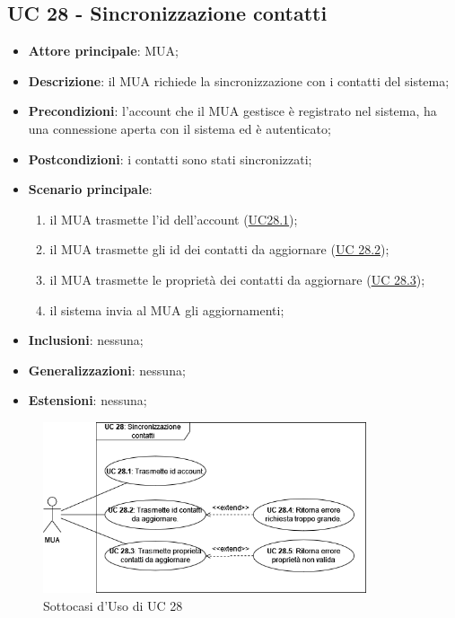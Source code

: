 
\subsection{UC 28 - Sincronizzazione contatti} \label{sec:UC28}
    
    \begin{itemize}
        \item \textbf{Attore principale}: MUA;
        \item \textbf{Descrizione}: il MUA richiede la sincronizzazione con i contatti del sistema;
        \item \textbf{Precondizioni}: l’account che il MUA gestisce è registrato nel sistema, ha una connessione aperta con il sistema ed è autenticato;
        \item \textbf{Postcondizioni}: i contatti sono stati sincronizzati;
        \item \textbf{Scenario principale}:
            \begin{enumerate}
                \item il MUA trasmette l'id dell'account (\hyperref[sec:UC28.1]{UC28.1});
                \item il MUA trasmette gli id dei contatti da aggiornare (\hyperref[sec:UC28.2]{UC 28.2});
                \item il MUA trasmette le proprietà dei contatti da aggiornare (\hyperref[sec:UC28.3]{UC 28.3});
                \item il sistema invia al MUA gli aggiornamenti;
            \end{enumerate}
        \item \textbf{Inclusioni}: nessuna;
        \item \textbf{Generalizzazioni}: nessuna;
        \item \textbf{Estensioni}: nessuna;
    \end{itemize}

    \begin{figure}[H]
        \includegraphics[width=0.85\textwidth]{sections/uc_imgs/UC28.png}
        \centering
        \caption{Sottocasi d'Uso di UC 28}
    \end{figure}

